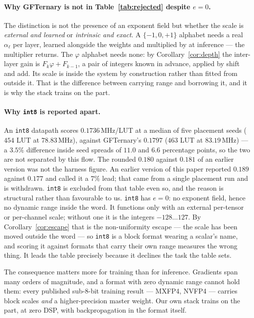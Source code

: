 \documentclass[11pt]{article}
\theoremstyle{definition}
\begin{document}
\paragraph{Why GFTernary is not in Table~\ref{tab:rejected} despite $e=0$.}
The distinction is not the presence of an exponent field but whether the scale is
\emph{external and learned} or \emph{intrinsic and exact}. A $\{-1,0,+1\}$
alphabet needs a real $\alpha_\ell$ per layer, learned alongside the weights and
multiplied by at inference --- the multiplier returns. The $\varphi$ alphabet
needs none: by Corollary~\ref{cor:depth} the inter-layer gain is
$F_k\varphi + F_{k-1}$, a pair of integers known in advance, applied by shift and
add. Its scale is inside the system by construction rather than fitted from
outside it. That is the difference between carrying range and borrowing it, and
it is why the stack trains on the part.

\paragraph{Why \texttt{int8} is reported apart.}
An \texttt{int8} datapath scores $0.1736$\,MHz/LUT at a median of five placement
seeds ($454$ LUT at $78.83$\,MHz), against GFTernary's $0.1797$ ($463$ LUT at
$83.19$\,MHz) --- a $3.5\%$ difference inside seed spreads of $11.0$ and $6.6$
percentage points, so the two are not separated by this flow. The rounded
$0.180$ against $0.181$ of an earlier version was not the harness figure. An earlier version of
this paper reported $0.189$ against $0.177$ and called it a $7\%$ lead; that came
from a single placement run and is withdrawn. \texttt{int8} is excluded from that table even so, and the
reason is structural rather than favourable to us. \texttt{int8} has $e=0$: no exponent field, hence no dynamic
range inside the word. It functions only with an external per-tensor or
per-channel scale; without one it is the integers $-128\ldots127$. By
Corollary~\ref{cor:escape} that is the non-uniformity escape --- the scale has
been moved outside the word --- so \texttt{int8} is a block format wearing a
scalar's name, and scoring it against formats that carry their own range measures
the wrong thing. It leads the table precisely because it declines the task the
table sets.

The consequence matters more for training than for inference. Gradients span many
orders of magnitude, and a format with zero dynamic range cannot hold them: every
published sub-8-bit training result --- MXFP4, NVFP4 --- carries block scales
\emph{and} a higher-precision master weight. Our own stack trains on the part, at
zero DSP, with backpropagation in the format itself.
\end{document}
